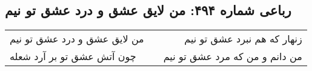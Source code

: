 \begin{center}
\section*{رباعی شماره ۴۹۴: من لایق عشق و درد عشق تو نیم}
\label{sec:sh494}
\begin{longtable}{l p{0.5cm} r}
من لایق عشق و درد عشق تو نیم
&&
زنهار که هم نبرد عشق تو نیم
\\
چون آتش عشق تو بر آرد شعله
&&
من دانم و من که مرد عشق تو نیم
\\
\end{longtable}
\end{center}
